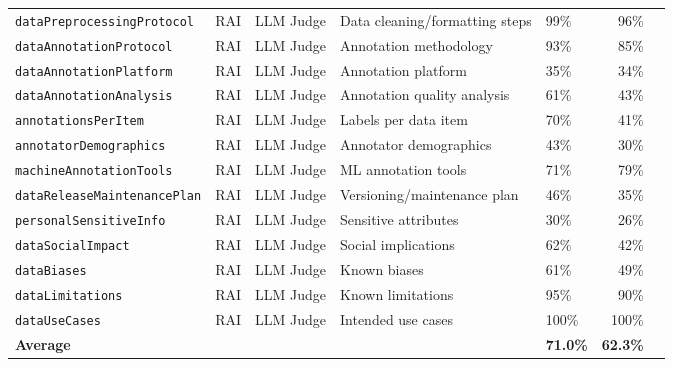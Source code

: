 \begin{table}[t]
\begin{tabular}{lllllrr}
\texttt{dataPreprocessingProtocol} & RAI & LLM Judge & Data cleaning/formatting steps & 99\% & 96\% \\
\texttt{dataAnnotationProtocol} & RAI & LLM Judge & Annotation methodology & 93\% & 85\% \\
\texttt{dataAnnotationPlatform} & RAI & LLM Judge & Annotation platform & 35\% & 34\% \\
\texttt{dataAnnotationAnalysis} & RAI & LLM Judge & Annotation quality analysis & 61\% & 43\% \\
\texttt{annotationsPerItem} & RAI & LLM Judge & Labels per data item & 70\% & 41\% \\
\texttt{annotatorDemographics} & RAI & LLM Judge & Annotator demographics & 43\% & 30\% \\
\texttt{machineAnnotationTools} & RAI & LLM Judge & ML annotation tools & 71\% & 79\% \\
\texttt{dataReleaseMaintenancePlan} & RAI & LLM Judge & Versioning/maintenance plan & 46\% & 35\% \\
\texttt{personalSensitiveInfo} & RAI & LLM Judge & Sensitive attributes & 30\% & 26\% \\
\texttt{dataSocialImpact} & RAI & LLM Judge & Social implications & 62\% & 42\% \\
\texttt{dataBiases} & RAI & LLM Judge & Known biases & 61\% & 49\% \\
\texttt{dataLimitations} & RAI & LLM Judge & Known limitations & 95\% & 90\% \\
\texttt{dataUseCases} & RAI & LLM Judge & Intended use cases & 100\% & 100\% \\
\midrule
\textbf{Average} & & & & \textbf{71.0\%} & \textbf{62.3\%} \\
\bottomrule
\end{tabular}
\end{table}